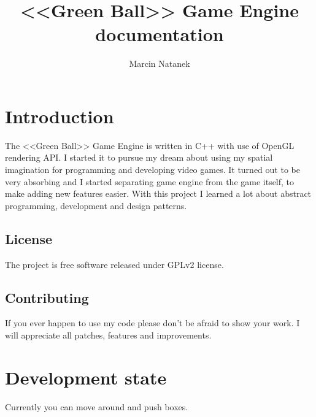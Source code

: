 \documentclass[11pt,a4paper,oneside]{report}
\title{<<Green Ball>> Game Engine documentation}
\author{Marcin Natanek}
\begin{document}

\maketitle
\pagebreak
\tableofcontents
\pagebreak

\chapter{Introduction}
The <<Green Ball>> Game Engine is written in C++ with use of OpenGL rendering API. I started it to pursue my dream about using my spatial imagination for programming and developing video games. It turned out to be very absorbing and I started separating game engine from the game itself, to make adding new features easier. With this project I learned a lot about abstract programming, development and design patterns.

\section{License}
The project is free software released under GPLv2 license.

\section{Contributing}
If you ever happen to use my code please don't be afraid to show your work. I will appreciate all patches, features and improvements.

\chapter{Development state}
Currently you can move around and push boxes.
\end{document}

